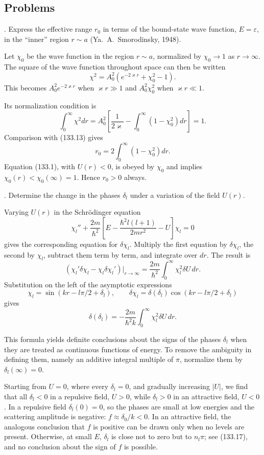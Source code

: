 \subsection*{Problems}

. Express the effective range $r_0$ in terms of the bound-state wave function, $E=\varepsilon$, in the ``inner'' region $r\sim a$ (Ya.~A.~Smorodinsky, 1948).

\SolutionHeading Let $\chi_0$ be the wave function in the region $r\sim a$, normalized by $\chi_0\to1$ as $r\to\infty$. The square of the wave function throughout space can then be written
\[
 \chi^2=A_0^2(e^{-2\varkappa r}+\chi_0^2-1).
\]
This becomes $A_0^2e^{-2\varkappa r}$ when $\varkappa r\gg1$ and $A_0^2\chi_0^2$ when $\varkappa r\ll1$.

Its normalization condition is
\[
 \int_0^\infty\chi^2dr=A_0^2\left[\frac1{2\varkappa}-\int_0^\infty(1-\chi_0^2)dr\right]=1.
\]
Comparison with (133.13) gives
\[
 r_0=2\int_0^\infty(1-\chi_0^2)dr.
\]
Equation (133.1), with $U(r)<0$, is obeyed by $\chi_0$ and implies $\chi_0(r)<\chi_0(\infty)=1$. Hence $r_0>0$ always.

. Determine the change in the phases $\delta_l$ under a variation of the field $U(r)$.

\SolutionHeading Varying $U(r)$ in the Schrödinger equation
\[
 \chi_l''+\frac{2m}{\hbar^2}\left[E-\frac{\hbar^2l(l+1)}{2mr^2}-U\right]\chi_l=0
\]
gives the corresponding equation for $\delta\chi_l$. Multiply the first equation by $\delta\chi_l$, the second by $\chi_l$, subtract them term by term, and integrate over $dr$. The result is
\[
 (\chi_l'\delta\chi_l-\chi_l\delta\chi_l')|_{r\to\infty}
 =\frac{2m}{\hbar^2}\int_0^\infty\chi_l^2\delta U\,dr.
\]
Substitution on the left of the asymptotic expressions
\[
 \chi_l=\sin(kr-l\pi/2+\delta_l),\qquad
 \delta\chi_l=\delta(\delta_l)\cos(kr-l\pi/2+\delta_l)
\]
gives
\[
 \delta(\delta_l)=-\frac{2m}{\hbar^2k}\int_0^\infty\chi_l^2\delta U\,dr.
\]

This formula yields definite conclusions about the signs of the phases $\delta_l$ when they are treated as continuous functions of energy. To remove the ambiguity in defining them, namely an additive integral multiple of $\pi$, normalize them by $\delta_l(\infty)=0$.

Starting from $U=0$, where every $\delta_l=0$, and gradually increasing $|U|$, we find that all $\delta_l<0$ in a repulsive field, $U>0$, while $\delta_l>0$ in an attractive field, $U<0$. In a repulsive field $\delta_l(0)=0$, so the phases are small at low energies and the scattering amplitude is negative: $f\approx\delta_0/k<0$. In an attractive field, the analogous conclusion that $f$ is positive can be drawn only when no levels are present. Otherwise, at small $E$, $\delta_l$ is close not to zero but to $n_l\pi$; see (133.17), and no conclusion about the sign of $f$ is possible.

